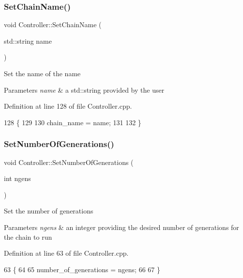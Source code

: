 \subsubsection{\texorpdfstring{Set\+Chain\+Name()}{SetChainName()}}
{\footnotesize\ttfamily void Controller\+::\+Set\+Chain\+Name (\begin{DoxyParamCaption}\item[{std\+::string}]{name }\end{DoxyParamCaption})}

Set the name of the name 
\begin{DoxyParams}{Parameters}
{\em name} & a std\+::string provided by the user \\
\hline
\end{DoxyParams}


Definition at line 128 of file Controller.\+cpp.


\begin{DoxyCode}
128                                             \{
129   
130   chain\_name = name;
131   
132 \}
\end{DoxyCode}
\mbox{\label{classController_aa42d6aa39fd621b739f2d86295e0b943}} 
\subsubsection{\texorpdfstring{Set\+Number\+Of\+Generations()}{SetNumberOfGenerations()}}
{\footnotesize\ttfamily void Controller\+::\+Set\+Number\+Of\+Generations (\begin{DoxyParamCaption}\item[{int}]{ngens }\end{DoxyParamCaption})}

Set the number of generations 
\begin{DoxyParams}{Parameters}
{\em ngens} & an integer providing the desired number of generations for the chain to run \\
\hline
\end{DoxyParams}


Definition at line 63 of file Controller.\+cpp.


\begin{DoxyCode}
63                                                 \{
64   
65   number\_of\_generations = ngens;
66   
67 \}
\end{DoxyCode}
\mbox{\label{classController_a1438b54d76df7239f361bd93dfbf9246}} 
